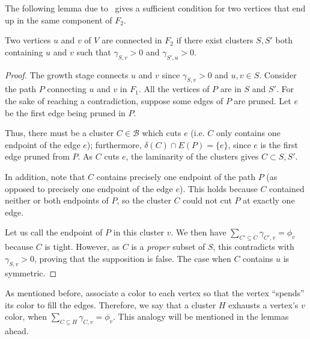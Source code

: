 The following lemma due to~\cite{Bateni} gives a sufficient condition for two vertices that end up in the same component of \(F_2\).

\begin{lemma} \label{clustering_connecting_bateni_3_4}
    Two vertices \(u\) and \(v\) of \(V\) are connected in \(F_2\) if there exist clusters \(S, S'\) both containing \(u\) and \(v\) such that \(\gamma_{S, v} > 0\) and \(\gamma_{S', u} > 0\).
\end{lemma}
\begin{proof}

    The growth stage connects \(u\) and \(v\) since \(\gamma_{S, v} > 0\) and \(u, v \in S\). Consider the path \(P\) connecting \(u\) and \(v\) in \(F_1\). All the vertices of \(P\) are in \(S\) and \(S'\). For the sake of reaching a contradiction, suppose some edges of \(P\) are pruned. Let \(e\) be the first edge being pruned in \(P\). 

    Thus, there must be a cluster \(C \in \mathcal{B}\) which cuts \(e\) (i.e. \(C\) only contains one endpoint of the edge \(e\)); furthermore, \(\delta(C) \cap E(P) = \{e\}\), since \(e\) is the first edge pruned from \(P\). As \(C\) cuts \(e\), the laminarity of the clusters gives \(C \subset S, S'\).

    In addition, note that \(C\) contains precisely one endpoint of the path \(P\) (as opposed to precisely one endpoint of the edge \(e\)). This holds because \(C\) contained neither or both endpoints of \(P\), so the cluster \(C\) could not cut \(P\) at exactly one edge.

    Let us call the endpoint of \(P\) in this cluster \(v\). We then have \(\sum_{C' \subseteq C} \gamma_{C',v} = \phi_v\) because \(C\) is tight. However, as \(C\) is a \textit{proper} subset of \(S\), this contradicts with \(\gamma_{S, v} > 0\), proving that the supposition is false. The case when \(C\) contains \(u\) is symmetric.
\end{proof}

As mentioned before, \citeauthor{Bateni} associate a color to each vertex so that the vertex ``spends'' its color to fill the edges. Therefore, we say that a cluster \(H\) exhausts a vertex's \(v\) color, when \(\sum_{C \subseteq H} \gamma_{C, v} = \phi_v\). This analogy will be mentioned in the lemmas ahead.

